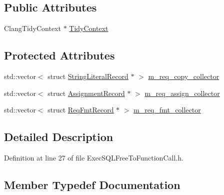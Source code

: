 \subsection*{Public Attributes}
\begin{DoxyCompactItemize}
\item 
Clang\+Tidy\+Context $\ast$ \hyperlink{classclang_1_1tidy_1_1pagesjaunes_1_1_exec_s_q_l_free_to_function_call_a238ae5f1ee7e1f64de152b45edbb529a}{Tidy\+Context}
\end{DoxyCompactItemize}
\subsection*{Protected Attributes}
\begin{DoxyCompactItemize}
\item 
std\+::vector$<$ struct \hyperlink{structclang_1_1tidy_1_1pagesjaunes_1_1_exec_s_q_l_free_to_function_call_1_1_string_literal_record}{String\+Literal\+Record} $\ast$ $>$ \hyperlink{classclang_1_1tidy_1_1pagesjaunes_1_1_exec_s_q_l_free_to_function_call_a8b6ac303a04f4a27ffed9117227105a1}{m\+\_\+req\+\_\+copy\+\_\+collector}
\item 
std\+::vector$<$ struct \hyperlink{structclang_1_1tidy_1_1pagesjaunes_1_1_exec_s_q_l_free_to_function_call_1_1_assignment_record}{Assignment\+Record} $\ast$ $>$ \hyperlink{classclang_1_1tidy_1_1pagesjaunes_1_1_exec_s_q_l_free_to_function_call_abb7a7aa7ae598abf4f6d2e6ccd139dda}{m\+\_\+req\+\_\+assign\+\_\+collector}
\item 
std\+::vector$<$ struct \hyperlink{structclang_1_1tidy_1_1pagesjaunes_1_1_exec_s_q_l_free_to_function_call_1_1_req_fmt_record}{Req\+Fmt\+Record} $\ast$ $>$ \hyperlink{classclang_1_1tidy_1_1pagesjaunes_1_1_exec_s_q_l_free_to_function_call_aab2c44ef85963dd6a7c99cf6864c95e4}{m\+\_\+req\+\_\+fmt\+\_\+collector}
\end{DoxyCompactItemize}


\subsection{Detailed Description}


Definition at line 27 of file Exec\+S\+Q\+L\+Free\+To\+Function\+Call.\+h.



\subsection{Member Typedef Documentation}
\mbox{\label{classclang_1_1tidy_1_1pagesjaunes_1_1_exec_s_q_l_free_to_function_call_af0b034c76887939877049fe00944b216}} 
